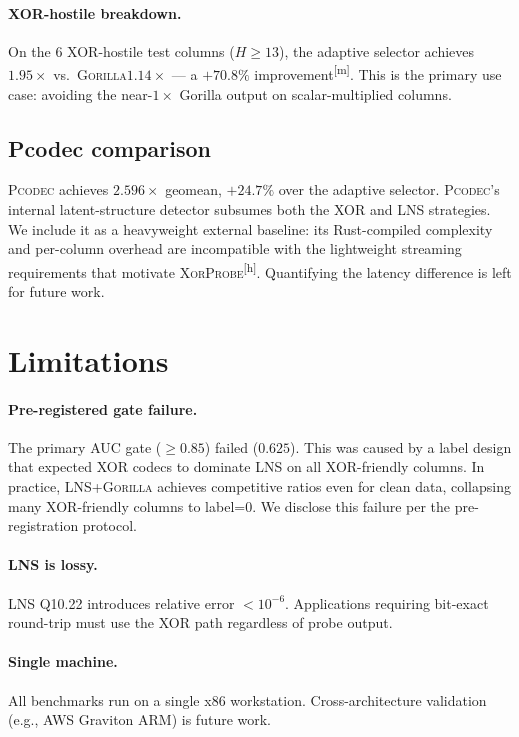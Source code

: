 \documentclass[sigconf]{acmart}
\newcommand{\gorilla}{\textsc{Gorilla}\xspace}
\newcommand{\pcodec}{\textsc{Pcodec}\xspace}
\newcommand{\system}{\textsc{XorProbe}\xspace}
\newcommand{\measured}{\textsuperscript{[m]}\xspace}
\newcommand{\hypothesis}{\textsuperscript{[h]}\xspace}
\begin{document}
\paragraph{XOR-hostile breakdown.}
On the 6 XOR-hostile test columns ($H \geq 13$), the adaptive selector
achieves $1.95\times$ vs.\ \gorilla $1.14\times$ — a $+70.8\%$
improvement\measured.  This is the primary use case: avoiding the near-$1\times$
Gorilla output on scalar-multiplied columns.

\subsection{Pcodec comparison}

\pcodec achieves $2.596\times$ geomean, $+24.7\%$ over the adaptive
selector.  \pcodec's internal latent-structure detector subsumes both the
XOR and LNS strategies.  We include it as a heavyweight external baseline:
its Rust-compiled complexity and per-column overhead are incompatible with
the lightweight streaming requirements that motivate \system\hypothesis.
Quantifying the latency difference is left for future work.

\section{Limitations}
\label{sec:limitations}

\paragraph{Pre-registered gate failure.}
The primary AUC gate ($\geq 0.85$) failed ($0.625$).  This was caused by
a label design that expected XOR codecs to dominate LNS on all
XOR-friendly columns.  In practice, LNS+\gorilla achieves competitive ratios
even for clean data, collapsing many XOR-friendly columns to label=0.  We
disclose this failure per the pre-registration protocol.

\paragraph{LNS is lossy.}
LNS Q10.22 introduces relative error $< 10^{-6}$.  Applications requiring
bit-exact round-trip must use the XOR path regardless of probe output.

\paragraph{Single machine.}
All benchmarks run on a single x86 workstation.  Cross-architecture
validation (e.g., AWS Graviton ARM) is future work.
\end{document}
